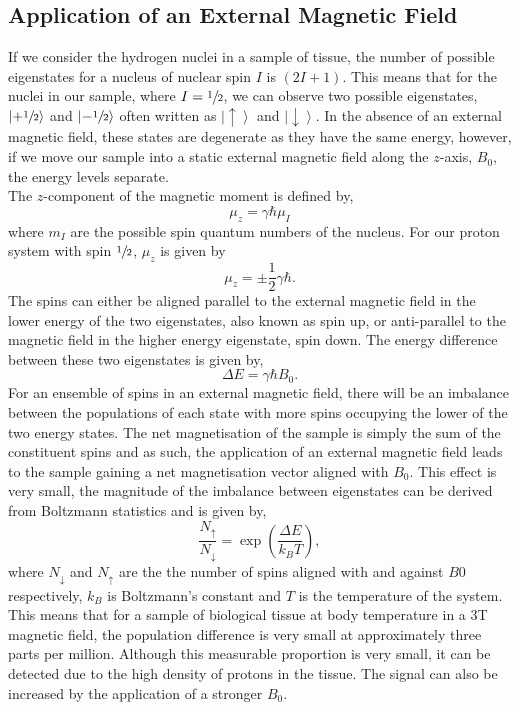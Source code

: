 \subsection{Application of an External Magnetic Field}
If we consider the hydrogen nuclei in a sample of tissue, the number of possible eigenstates for a nucleus of nuclear spin $I$ is $\left(2I + 1\right)$. This means that for the  nuclei in our sample, where $I=\sfrac{1}{2}$, we can observe two possible eigenstates, $\left| + \sfrac{1}{2} \right \rangle$ and $\left| - \sfrac{1}{2} \right \rangle$ often written as $\left|  \uparrow \right \rangle$ and $\left|  \downarrow \right \rangle$. In the absence of an external magnetic field, these states are degenerate as they have the same energy, however, if we move our sample into a static external magnetic field along the $z$-axis, $B_0$, the energy levels separate.\\
The $z$-component of the magnetic moment is defined by,
\begin{equation}
\mu_z=\gamma \hbar \mu_I
\label{eq:theory_longitudinal_magnetic_moment}
\end{equation}
where $m_I$ are the possible spin quantum numbers of the nucleus. For our proton system with spin $\sfrac{1}{2}$, $\mu_z$ is given by
\begin{equation}
\mu_z = \pm \frac{1}{2}\gamma\hbar.
\end{equation}
The spins can either be aligned parallel to the external magnetic field in the lower energy of the two eigenstates, also known as spin up, or anti-parallel to the magnetic field in the higher energy eigenstate, spin down. The energy difference between these two eigenstates is given by,
\begin{equation}
\Delta E = \gamma \hbar B_0.
\label{eq:theory_zeeman}
\end{equation}
For an ensemble of spins in an external magnetic field, there will be an imbalance between the populations of each state with more spins occupying the lower of the two energy states. The net magnetisation of the sample is simply the sum of the constituent spins and as such, the application of an external magnetic field leads to the sample gaining a net magnetisation vector aligned with $B_0$. This effect is very small, the magnitude of the imbalance between eigenstates can be derived from Boltzmann statistics and is given by,
\begin{equation}
\frac{N_{\uparrow}}{N_{\downarrow}} = \exp \left(\frac{\Delta E}{k_B T}\right),
\label{eq:theory_boltzman}
\end{equation}
where $N_{\downarrow}$ and $N_{\uparrow}$ are the the number of spins aligned with and against $B0$ respectively, $k_B$ is Boltzmann's constant and $T$ is the temperature of the system. This means that for a sample of biological tissue at body temperature in a 3T magnetic field, the population difference is very small at approximately three parts per million. Although this measurable proportion is very small, it can be detected due to the high density of protons in the tissue. The signal can also be increased by the application of a stronger $B_0$.

